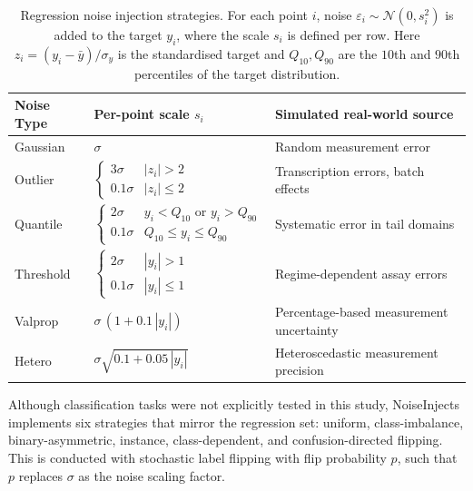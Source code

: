 \documentclass[pdflatex,sn-basic]{sn-jnl}%
\theoremstyle{thmstyleone}%
\theoremstyle{thmstyletwo}%
\theoremstyle{thmstylethree}%
\begin{document}
\begin{table}[h]
\centering
\renewcommand{\arraystretch}{1.4}
\begin{tabular}{l l l}
\toprule
\textbf{Noise Type} & \textbf{Per-point scale $s_i$} & \textbf{Simulated real-world source} \\
\midrule
Gaussian & $\sigma$ & Random measurement error \\
\addlinespace
Outlier &
$\begin{cases} 3\sigma & |z_i| > 2 \\ 0.1\sigma & |z_i| \leq 2 \end{cases}$
& Transcription errors, batch effects \\
\addlinespace
Quantile &
$\begin{cases} 2\sigma & y_i < Q_{10} \text{ or } y_i > Q_{90} \\ 0.1\sigma & Q_{10} \leq y_i \leq Q_{90} \end{cases}$
& Systematic error in tail domains \\
\addlinespace
Threshold &
$\begin{cases} 2\sigma & |y_i| > 1 \\ 0.1\sigma & |y_i| \leq 1 \end{cases}$
& Regime-dependent assay errors \\
\addlinespace
Valprop & $\sigma\,(1 + 0.1\,|y_i|)$ & Percentage-based measurement uncertainty \\
\addlinespace
Hetero & $\sigma\sqrt{0.1 + 0.05\,|y_i|}$ & Heteroscedastic measurement precision \\
\bottomrule
\end{tabular}
\caption{Regression noise injection strategies. For each point $i$, noise
$\varepsilon_i \sim \mathcal{N}(0, s_i^2)$ is added to the target $y_i$, where
the scale $s_i$ is defined per row. Here $z_i = (y_i - \bar{y})/\sigma_y$ is the
standardised target and $Q_{10}, Q_{90}$ are the $10$th and $90$th percentiles
of the target distribution.}
\label{tab:regression_noise}
\end{table}

Although classification tasks were not explicitly tested in this study, NoiseInjects implements six strategies that mirror the regression set: uniform, class-imbalance, binary-asymmetric, instance, class-dependent, and confusion-directed flipping. This is conducted with stochastic label flipping with flip probability $p$, such that $p$ replaces $\sigma$ as the noise scaling factor. 
\end{document}
